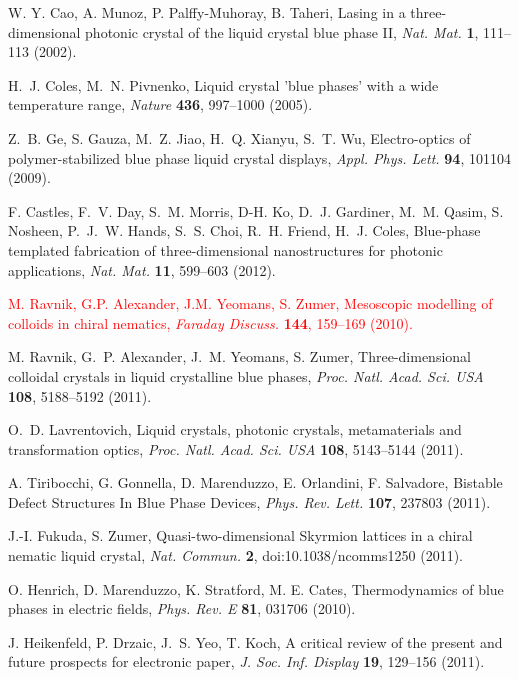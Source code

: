 \documentclass[12pt]{article}
\begin{document}
\begin{thebibliography}{99}
W. Y. Cao, A. Munoz, P. Palffy-Muhoray, B. Taheri,
Lasing in a three-dimensional photonic crystal of the liquid crystal blue 
phase II,
{\it Nat. Mat.} {\bf 1}, 111--113 (2002).

H.~J. Coles, M.~N. Pivnenko,
Liquid crystal 'blue phases' with a wide temperature range,
{\it Nature} {\bf 436}, 997--1000 (2005).

Z.~B. Ge, S. Gauza, M.~Z. Jiao, H.~Q. Xianyu, S.~T. Wu,
 Electro-optics of polymer-stabilized blue phase liquid crystal displays,
{\it Appl. Phys. Lett.} {\bf 94}, 101104 (2009).

F. Castles, F.~V. Day, S.~M. Morris, D-H. Ko, D.~J. Gardiner, M.~M. Qasim,
S. Nosheen, P.~J.~W. Hands, S.~S. Choi, R.~H. Friend, H.~J. Coles,
Blue-phase templated fabrication of three-dimensional nanostructures for
photonic applications, {\it Nat. Mat.} {\bf 11}, 599--603 (2012).

\textcolor{red}{M. Ravnik, G.P. Alexander, J.M. Yeomans, S. Zumer,
Mesoscopic modelling of colloids in chiral nematics,
{\it Faraday Discuss.} {\bf 144}, 159--169 (2010).}

M. Ravnik, G.~P. Alexander, J.~M. Yeomans, S. Zumer,
Three-dimensional colloidal crystals in liquid crystalline 
blue phases, {\it Proc. Natl. Acad. Sci. USA} {\bf 108}, 5188--5192 (2011).

 O.~D. Lavrentovich,
 Liquid crystals, photonic crystals, metamaterials and transformation optics, 
{\it Proc. Natl. Acad. Sci. USA} {\bf 108}, 5143--5144 (2011).

A. Tiribocchi, G. Gonnella, D. Marenduzzo, E. Orlandini, F. Salvadore,
Bistable Defect Structures In Blue Phase Devices,
 {\it Phys. Rev. Lett.} {\bf 107}, 237803 (2011).

J.-I. Fukuda, S. Zumer,
Quasi-two-dimensional Skyrmion lattices in a chiral nematic liquid crystal,
{\it Nat. Commun.} {\bf 2}, doi:10.1038/ncomms1250 (2011).

O. Henrich, D. Marenduzzo, K. Stratford, M. E. Cates,
Thermodynamics of blue phases in electric fields,
{\it Phys. Rev. E} {\bf 81}, 031706 (2010).

 J. Heikenfeld, P. Drzaic,  J.~S. Yeo, T. Koch,
A critical review of the present and future prospects for electronic paper,
{\it J. Soc. Inf. Display} {\bf 19}, 129--156 (2011).


\end{thebibliography}
\end{document}
